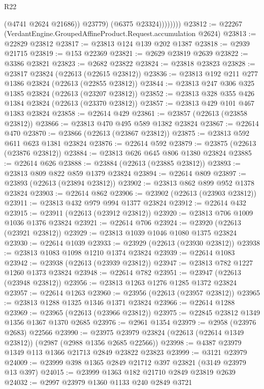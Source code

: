 \begin{lexlean}{R22}
\begin{coremodule}
                      (@4741 @2624 @21686))
                    @23779)
                  (@6375 @23324))))))))
@23812 := @22267 (VerdantEngine.GroupedAffineProduct.Request.accumulation @2624)
@23813 := @22829 @23812
@23817 := @23813 @124 @139 @202 @1387
@23818 := @2939 @21715
@23819 := @153 @22369
@23821 := @2629 @23819 @2639
@23822 := @3386 @23821
@23823 := @2682 @23822
@23824 := @23818 @23823
@23828 := @23817 @23824 (@22613 (@22615 @23812))
@23836 := @23813 @192 @211 @277 @1386 @23824 (@22613 (@22855 @23812))
@23844 := @23813 @247 @306 @325 @1385 @23824 (@22613 (@23207 @23812))
@23852 := @23813 @328 @355 @426 @1384 @23824 (@22613 (@23370 @23812))
@23857 := @23813 @429 @101 @467 @1383 @23824
@23858 := @22614 @429
@23861 := @23857 (@22613 (@23858 @23812))
@23866 := @23813 @470 @495 @589 @1382 @23824
@23867 := @22614 @470
@23870 := @23866 (@22613 (@23867 @23812))
@23875 := @23813 @592 @611 @623 @1381 @23824
@23876 := @22614 @592
@23879 := @23875 (@22613 (@23876 @23812))
@23884 := @23813 @626 @645 @806 @1380 @23824
@23885 := @22614 @626
@23888 := @23884 (@22613 (@23885 @23812))
@23893 := @23813 @809 @822 @859 @1379 @23824
@23894 := @22614 @809
@23897 := @23893 (@22613 (@23894 @23812))
@23902 := @23813 @862 @899 @952 @1378 @23824
@23903 := @22614 @862
@23906 := @23902 (@22613 (@23903 @23812))
@23911 := @23813 @432 @979 @994 @1377 @23824
@23912 := @22614 @432
@23915 := @23911 (@22613 (@23912 @23812))
@23920 := @23813 @706 @1009 @1036 @1376 @23824
@23921 := @22614 @706
@23924 := @23920 (@22613 (@23921 @23812))
@23929 := @23813 @1039 @1046 @1080 @1375 @23824
@23930 := @22614 @1039
@23933 := @23929 (@22613 (@23930 @23812))
@23938 := @23813 @1083 @1098 @1210 @1374 @23824
@23939 := @22614 @1083
@23942 := @23938 (@22613 (@23939 @23812))
@23947 := @23813 @782 @1227 @1260 @1373 @23824
@23948 := @22614 @782
@23951 := @23947 (@22613 (@23948 @23812))
@23956 := @23813 @1263 @1276 @1285 @1372 @23824
@23957 := @22614 @1263
@23960 := @23956 (@22613 (@23957 @23812))
@23965 := @23813 @1288 @1325 @1346 @1371 @23824
@23966 := @22614 @1288
@23969 := @23965 (@22613 (@23966 @23812))
@23975 := @22845 @23812 @1349 @1356 @1367 @1370 @2685
@23976 := @2961 @1354
@23979 := @2958 (@23976 @2683) @22566
@23990 := @23975 @23979 @23824 (@22613 (@22614 @1349 @23812)) (@2987 (@2988 @1356 @2685 @22566))
@23998 := @4387 @23979 @1349 @113 @1366 @21713 @2849 @23822 @23823
@23999 := @3121 @23979
@24009 := @23999 @398 @1365 @2849 @21712 @397 @23821 (@3149 @23979 @13 @397)
@24015 := @23999 @1363 @182 @21710 @2849 @23819 @2639
@24032 := @2997
    @23979
    @1360
    @1133
    @240
    @2849
    @3721

\end{coremodule}
\end{lexlean}
